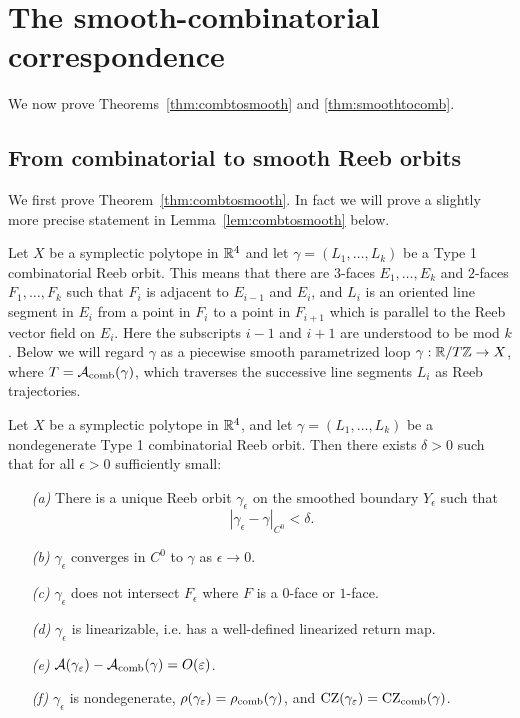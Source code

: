 \section{The smooth-combinatorial correspondence}
\label{sec:correspondence}

We now prove Theorems~\ref{thm:combtosmooth} and \ref{thm:smoothtocomb}.

\subsection{From combinatorial to smooth Reeb orbits}
\label{sec:combtosmooth}

We first prove Theorem~\ref{thm:combtosmooth}. In fact we will prove a slightly more precise statement in Lemma~\ref{lem:combtosmooth} below.

 Let $X$ be a symplectic polytope in ${\mathbb R}^4$ and let $\gamma=(L_1,\ldots,L_k)$ be a Type 1 combinatorial Reeb orbit. This means that there are $3$-faces $E_1,\ldots,E_k$ and $2$-faces $F_1,\ldots,F_k$ such that $F_i$ is adjacent to $E_{i-1}$ and $E_i$, and $L_i$ is an oriented line segment in $E_i$ from a point in $F_i$ to a point in $F_{i+1}$ which is parallel to the Reeb vector field on $E_i$. Here the subscripts $i-1$ and $i+1$ are understood to be mod $k$. Below we will regard $\gamma$ as a piecewise smooth parametrized loop $\gamma:{\mathbb R}/T{\mathbb Z}\to X$, where $T={\mathcal A}_{\operatorname{comb}}(\gamma)$, which traverses the successive line segments $L_i$ as Reeb trajectories.

\begin{lemma}
\label{lem:combtosmooth}
Let $X$ be a symplectic polytope in ${\mathbb R}^4$, and let $\gamma=(L_1,\ldots,L_k)$ be a nondegenerate Type 1 combinatorial Reeb orbit. Then there exists $\delta>0$ such that for all $\epsilon>0$ sufficiently small:
\begin{itemize}
\item[\emph{(a)}]
There is a unique Reeb orbit $\gamma_\epsilon$ on the smoothed boundary $Y_\epsilon$ such that
\[
|\gamma_\epsilon - \gamma|_{C^0} < \delta.
\]
\item[\emph{(b)}]
$\gamma_\epsilon$ converges in $C^0$ to $\gamma$ as $\epsilon\to 0$.
\item[\emph{(c)}]
$\gamma_\epsilon$ does not intersect $F_\epsilon$ where $F$ is a $0$-face or $1$-face.
\item[\emph{(d)}]
$\gamma_\epsilon$ is linearizable, i.e. has a well-defined linearized return map.
\item[\emph{(e)}]
${\mathcal A}(\gamma_\varepsilon) - {\mathcal A}_{\operatorname{comb}}(\gamma) = O(\varepsilon)$.
\item[\emph{(f)}]
$\gamma_\epsilon$ is nondegenerate, $\rho(\gamma_\varepsilon)=\rho_{\operatorname{comb}}(\gamma)$, and $\operatorname{CZ}(\gamma_\varepsilon)=\operatorname{CZ}_{\operatorname{comb}}(\gamma)$.
\end{itemize}
\end{lemma}

